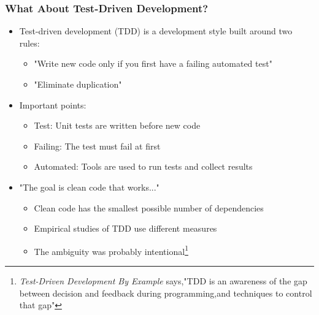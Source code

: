 \documentclass{beamer}
\begin{document}
\begin{frame}
\frametitle{What About Test-Driven Development?}
\begin{itemize}
	\item Test-driven development (TDD) is a development style built around two rules:\cite{tddByExample}
	\begin{itemize}
		\item "Write new code only if you first have a failing automated test"
		\item "Eliminate duplication"
	\end{itemize}
	\item Important points:
	\begin{itemize}
		\item Test: Unit tests are written before new code
		\item Failing: The test must fail at first
		\item Automated: Tools are used to run tests and collect results
	\end{itemize}
	\item "The goal is clean code that works..."\cite{tddByExample}
	\begin{itemize}
		\item Clean code has the smallest possible number of dependencies
		\item Empirical studies of TDD use different measures
		\item The ambiguity was probably intentional\footnote{\textit{Test-Driven Development By Example} says,"TDD is an awareness of the gap between decision and feedback during programming,and techniques to control that gap"}
	\end{itemize}
\end{itemize}
\end{frame}
\end{document}
